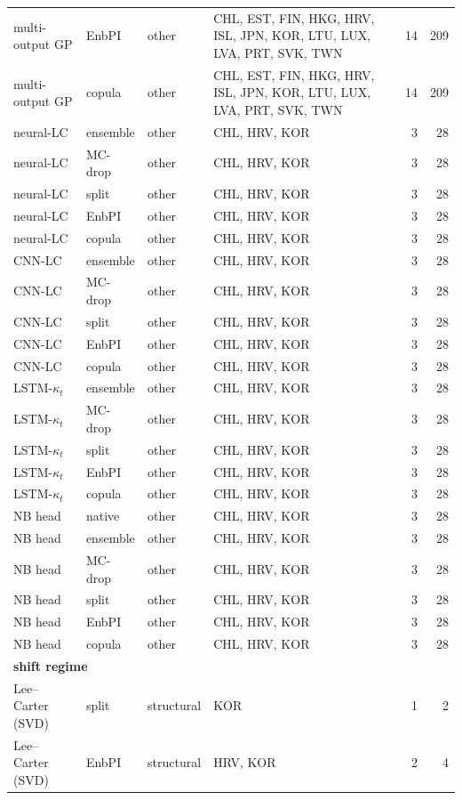 {\begin{longtable}{@{}llp{1.5cm}p{5.6cm}rr@{}}
multi-output GP & EnbPI & other & CHL, EST, FIN, HKG, HRV, ISL, JPN, KOR, LTU, LUX, LVA, PRT, SVK, TWN & 14 & 209 \\
multi-output GP & copula & other & CHL, EST, FIN, HKG, HRV, ISL, JPN, KOR, LTU, LUX, LVA, PRT, SVK, TWN & 14 & 209 \\
neural-LC & ensemble & other & CHL, HRV, KOR & 3 & 28 \\
neural-LC & MC-drop & other & CHL, HRV, KOR & 3 & 28 \\
neural-LC & split & other & CHL, HRV, KOR & 3 & 28 \\
neural-LC & EnbPI & other & CHL, HRV, KOR & 3 & 28 \\
neural-LC & copula & other & CHL, HRV, KOR & 3 & 28 \\
CNN-LC & ensemble & other & CHL, HRV, KOR & 3 & 28 \\
CNN-LC & MC-drop & other & CHL, HRV, KOR & 3 & 28 \\
CNN-LC & split & other & CHL, HRV, KOR & 3 & 28 \\
CNN-LC & EnbPI & other & CHL, HRV, KOR & 3 & 28 \\
CNN-LC & copula & other & CHL, HRV, KOR & 3 & 28 \\
LSTM-$\kappa_t$ & ensemble & other & CHL, HRV, KOR & 3 & 28 \\
LSTM-$\kappa_t$ & MC-drop & other & CHL, HRV, KOR & 3 & 28 \\
LSTM-$\kappa_t$ & split & other & CHL, HRV, KOR & 3 & 28 \\
LSTM-$\kappa_t$ & EnbPI & other & CHL, HRV, KOR & 3 & 28 \\
LSTM-$\kappa_t$ & copula & other & CHL, HRV, KOR & 3 & 28 \\
NB head & native & other & CHL, HRV, KOR & 3 & 28 \\
NB head & ensemble & other & CHL, HRV, KOR & 3 & 28 \\
NB head & MC-drop & other & CHL, HRV, KOR & 3 & 28 \\
NB head & split & other & CHL, HRV, KOR & 3 & 28 \\
NB head & EnbPI & other & CHL, HRV, KOR & 3 & 28 \\
NB head & copula & other & CHL, HRV, KOR & 3 & 28 \\
\multicolumn{6}{l}{\textbf{shift regime}} \\
\midrule
Lee--Carter (SVD) & split & structural & KOR & 1 & 2 \\
Lee--Carter (SVD) & EnbPI & structural & HRV, KOR & 2 & 4 \\

\end{longtable}}
